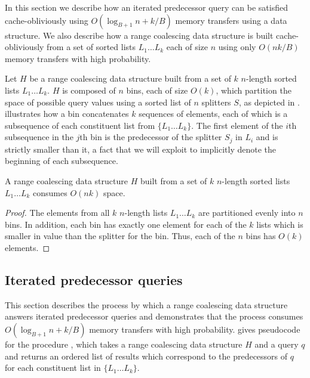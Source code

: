 
In this section we describe how an iterated predecessor query can be 
satisfied cache-obliviously using $O(\log_{B+1} n + k/B)$ 
memory transfers using a  data structure.  
We also describe how a range coalescing data structure is built 
cache-obliviously from a set of sorted lists $L_1 \ldots L_k$ each of size $n$ 
using only $O(nk/B)$ memory transfers with high probability.  


Let $H$ be a range coalescing data structure built from a set of $k$ $n$-length
sorted lists $L_1 \ldots L_k$.  $H$ is composed of $n$ bins, each of size $O(k)$,
which partition the space of possible query values using a sorted list of $n$ 
splitters $S$, as depicted in .  
illustrates how a bin concatenates $k$ sequences of elements, each of which is a 
subsequence of each constituent list from $\{L_1 \ldots L_k\}$.  
The first element of the $i$th subsequence in the $j$th bin is the predecessor
of the splitter $S_j$ in $L_i$ and is strictly smaller than it, a fact that we will 
exploit to implicitly denote the beginning of each subsequence.  

\begin{lemma}
A range coalescing data structure $H$ built from a set of $k$ $n$-length
sorted lists $L_1 \ldots L_k$ consumes $O(nk)$ space.
\end{lemma}
\begin{proof}
The elements from all $k$ $n$-length lists $L_1 \ldots L_k$ are partitioned 
evenly into $n$ bins.  In addition, each bin has exactly one element for each of 
the $k$ lists which is smaller in value than the splitter for the bin.  Thus, each
of the $n$ bins has $O(k)$ elements.
\end{proof}


\subsection*{Iterated predecessor queries}

This section describes the process by which a range coalescing data structure
answers iterated predecessor queries and demonstrates that the process consumes
$O(\log_{B+1} n + k/B)$ memory transfers with high probability.  
gives pseudocode for the procedure , which takes a range
coalescing data structure $H$ and a query $q$ and returns an ordered list of results which
correspond to the predecessors of $q$ for each constituent list in $\{ L_1 \ldots L_k \}$.

